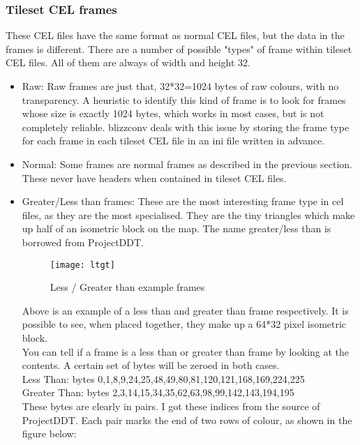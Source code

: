\subsubsection{Tileset CEL frames}
	These CEL files have the same format as normal CEL files, but the data in the frames is different. There are a number of possible "types" of frame within tileset CEL files. All of them are always of width and height 32.
\begin{itemize}

	\item{Raw:} Raw frames are just that, 32*32=1024 bytes of raw colours, with no transparency. A heuristic to identify this kind of frame is to look for frames whose size is exactly 1024 bytes,  which works in most cases, but is not completely reliable. blizzconv\cite{blizzconv} deals with this issue by storing the frame type for each frame in each tileset CEL file in an ini file written in advance.
	
	\item{Normal:} Some frames are normal frames as described in the previous section. These never have headers when contained in tileset CEL files.
	
	\item{Greater/Less than frames:} These are the most interesting frame type in cel files, as they are the most specialised. They are the tiny triangles which make up half of an isometric block on the map. The name greater/less than is borrowed from ProjectDDT\cite{ddt}. \\

\begin{figure}[H]
	\centering
	\texttt{[image: ltgt]}
	\caption{Less / Greater than example frames}
\end{figure}

 Above is an example of a less than and greater than frame respectively. It is possible to  see, when placed together, they make up a 64*32 pixel isometric block.\\
You can tell if a frame is a less than or greater than frame by looking at the contents. A certain set of bytes will be zeroed in both cases.\\
Less Than: bytes 0,1,8,9,24,25,48,49,80,81,120,121,168,169,224,225\\
Greater Than: bytes 2,3,14,15,34,35,62,63,98,99,142,143,194,195\\

	These bytes are clearly in pairs. I got these indices from the source of ProjectDDT\cite{ddt}. Each pair marks the end of two rows of colour, as shown in the figure below:\\
	

\end{itemize}
